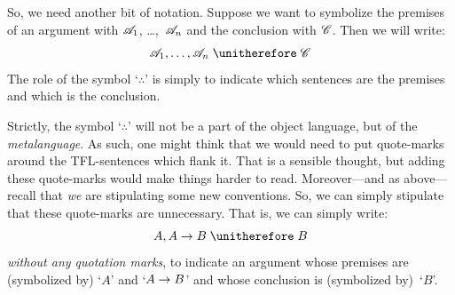 

So, we need another bit of notation. Suppose we want to symbolize the premises of an argument with $\mathscr{A}_1$, \dots,~$\mathscr{A}_n$ and the conclusion with $\mathscr{C}$. Then we will write:
$$\metav{A}_1, \ldots, \metav{A}_n \therefore \metav{C}$$
The role of the symbol `$\therefore$' is simply to indicate which sentences are the premises and which is the conclusion.


Strictly, the symbol `$\therefore$' will not be a part of the object language, but of the \emph{metalanguage}. As such, one might think that we would need to put quote-marks around the TFL-sentences which flank it. That is a sensible thought, but adding these quote-marks would make things harder to read. Moreover---and as above---recall that \emph{we} are stipulating some new conventions. So, we can simply stipulate that these quote-marks are unnecessary. That is, we can simply write:
$$A, A \eif B \therefore B$$
\emph{without any quotation marks}, to indicate an argument whose premises are (symbolized by) `$A$' and `$A \rightarrow B$' and whose conclusion is (symbolized by)~`$B$'.
